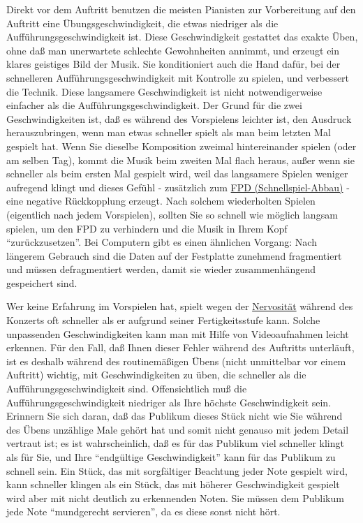 Direkt vor dem Auftritt benutzen die meisten Pianisten zur Vorbereitung auf den Auftritt eine Übungsgeschwindigkeit, die etwas niedriger als die Aufführungsgeschwindigkeit ist.
Diese Geschwindigkeit gestattet das exakte Üben, ohne daß man unerwartete schlechte Gewohnheiten annimmt, und erzeugt ein klares geistiges Bild der Musik.
Sie konditioniert auch die Hand dafür, bei der schnelleren Aufführungsgeschwindigkeit mit Kontrolle zu spielen, und verbessert die Technik.
Diese langsamere Geschwindigkeit ist nicht notwendigerweise einfacher als die Aufführungsgeschwindigkeit.
Der Grund für die zwei Geschwindigkeiten ist, daß es während des Vorspielens leichter ist, den Ausdruck herauszubringen, wenn man etwas schneller spielt als man beim letzten Mal gespielt hat.
Wenn Sie dieselbe Komposition zweimal hintereinander spielen (oder am selben Tag), kommt die Musik beim zweiten Mal flach heraus, außer wenn sie schneller als beim ersten Mal gespielt wird, weil das langsamere Spielen weniger aufregend klingt und dieses Gefühl - zusätzlich zum \hyperref[fpd]{FPD (Schnellspiel-Abbau)} - eine negative Rückkopplung erzeugt.
Nach solchem wiederholten Spielen (eigentlich nach jedem Vorspielen), sollten Sie so schnell wie möglich langsam spielen, um den FPD zu verhindern und die Musik in Ihrem Kopf \enquote{zurückzusetzen}.
Bei Computern gibt es einen ähnlichen Vorgang: Nach längerem Gebrauch sind die Daten auf der Festplatte zunehmend fragmentiert und müssen defragmentiert werden, damit sie wieder zusammenhängend gespeichert sind.

Wer keine Erfahrung im Vorspielen hat, spielt wegen der \hyperref[c1iii15]{Nervosität} während des Konzerts oft schneller als er aufgrund seiner Fertigkeitsstufe kann. 
Solche unpassenden Geschwindigkeiten kann man mit Hilfe von Videoaufnahmen leicht erkennen.
Für den Fall, daß Ihnen dieser Fehler während des Auftritts unterläuft, ist es deshalb während des routinemäßigen Übens (nicht unmittelbar vor einem Auftritt) wichtig, mit Geschwindigkeiten zu üben, die schneller als die Aufführungsgeschwindigkeit sind.
Offensichtlich muß die Aufführungsgeschwindigkeit niedriger als Ihre höchste Geschwindigkeit sein.
Erinnern Sie sich daran, daß das Publikum dieses Stück nicht wie Sie während des Übens unzählige Male gehört hat und somit nicht genauso mit jedem Detail vertraut ist; es ist wahrscheinlich, daß es für das Publikum viel schneller klingt als für Sie, und Ihre \enquote{endgültige Geschwindigkeit} kann für das Publikum zu schnell sein.
Ein Stück, das mit sorgfältiger Beachtung jeder Note gespielt wird, kann schneller klingen als ein Stück, das mit höherer Geschwindigkeit gespielt wird aber mit nicht deutlich zu erkennenden Noten.
Sie müssen dem Publikum jede Note \enquote{mundgerecht servieren}, da es diese sonst nicht hört.

